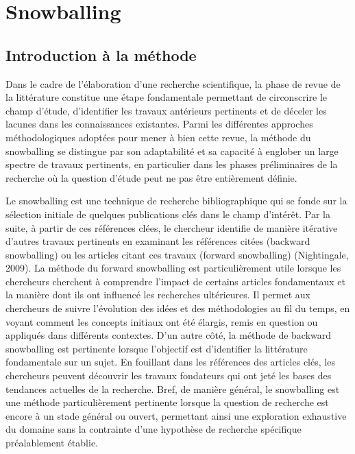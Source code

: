 \documentclass[
  letterpaper,
  DIV=11,
  numbers=noendperiod]{scrreprt}
\begin{document}
\section{Snowballing}\label{snowballing}

\subsection{Introduction à la
méthode}\label{introduction-uxe0-la-muxe9thode}

Dans le cadre de l'élaboration d'une recherche scientifique, la phase de
revue de la littérature constitue une étape fondamentale permettant de
circonscrire le champ d'étude, d'identifier les travaux antérieurs
pertinents et de déceler les lacunes dans les connaissances existantes.
Parmi les différentes approches méthodologiques adoptées pour mener à
bien cette revue, la méthode du snowballing se distingue par son
adaptabilité et sa capacité à englober un large spectre de travaux
pertinents, en particulier dans les phases préliminaires de la recherche
où la question d'étude peut ne pas être entièrement définie.

Le snowballing est une technique de recherche bibliographique qui se
fonde sur la sélection initiale de quelques publications clés dans le
champ d'intérêt. Par la suite, à partir de ces références clées, le
chercheur identifie de manière itérative d'autres travaux pertinents en
examinant les références citées (backward snowballing) ou les articles
citant ces travaux (forward snowballing) (Nightingale, 2009). La méthode
du forward snowballing est particulièrement utile lorsque les chercheurs
cherchent à comprendre l'impact de certains articles fondamentaux et la
manière dont ils ont influencé les recherches ultérieures. Il permet aux
chercheurs de suivre l'évolution des idées et des méthodologies au fil
du temps, en voyant comment les concepts initiaux ont été élargis, remis
en question ou appliqués dans différents contextes. D'un autre côté, la
méthode de backward snowballing est pertinente lorsque l'objectif est
d'identifier la littérature fondamentale sur un sujet. En fouillant dans
les références des articles clés, les chercheurs peuvent découvrir les
travaux fondateurs qui ont jeté les bases des tendances actuelles de la
recherche. Bref, de manière général, le snowballing est une méthode
particulièrement pertinente lorsque la question de recherche est encore
à un stade général ou ouvert, permettant ainsi une exploration
exhaustive du domaine sans la contrainte d'une hypothèse de recherche
spécifique préalablement établie.
\end{document}
